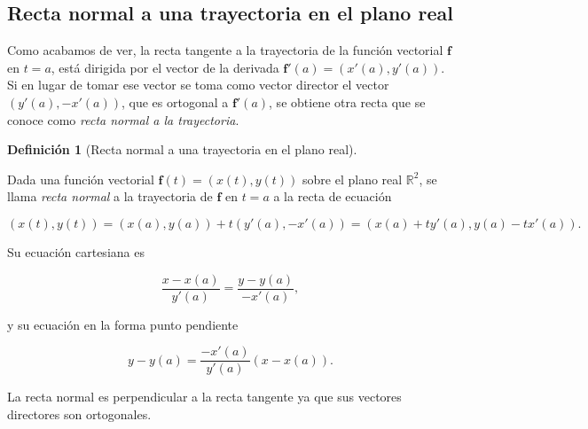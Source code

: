 \documentclass[
  a4paper,
]{scrreport}
\theoremstyle{plain}
\theoremstyle{definition}
\theoremstyle{plain}
\theoremstyle{plain}
\theoremstyle{definition}
\theoremstyle{definition}
\newtheorem{definition}{Definición}[chapter]
\theoremstyle{remark}
\begin{document}
\subsection{Recta normal a una trayectoria en el plano
real}\label{recta-normal-a-una-trayectoria-en-el-plano-real}

Como acabamos de ver, la recta tangente a la trayectoria de la función
vectorial \(\mathbf{f}\) en \(t=a\), está dirigida por el vector de la
derivada \(\mathbf{f}'(a)=(x'(a),y'(a))\). Si en lugar de tomar ese
vector se toma como vector director el vector \((y'(a),-x'(a))\), que es
ortogonal a \(\mathbf{f}'(a)\), se obtiene otra recta que se conoce como
\emph{recta normal a la trayectoria}.

\begin{definition}[Recta normal a una trayectoria en el plano
real]\protect\hypertarget{def-normal-trayectoria-plano}{}\label{def-normal-trayectoria-plano}

Dada una función vectorial \(\mathbf{f}(t)=(x(t),y(t))\) sobre el plano
real \(\mathbb{R}^2\), se llama \emph{recta normal} a la trayectoria de
\(\mathbf{f}\) en \(t=a\) a la recta de ecuación

\[
(x(t),y(t)) = (x(a),y(a))+t(y'(a),-x'(a)) = (x(a)+ty'(a),y(a)-tx'(a)).
\]

\end{definition}

Su ecuación cartesiana es

\[
\frac{x-x(a)}{y'(a)} = \frac{y-y(a)}{-x'(a)},
\]

y su ecuación en la forma punto pendiente

\[
y-y(a) = \frac{-x'(a)}{y'(a)}(x-x(a)).
\]

\begin{tcolorbox}[enhanced jigsaw, titlerule=0mm, arc=.35mm, colframe=quarto-callout-note-color-frame, bottomrule=.15mm, opacitybacktitle=0.6, rightrule=.15mm, coltitle=black, colback=white, toprule=.15mm, title=\textcolor{quarto-callout-note-color}{\faInfo}\hspace{0.5em}{Nota}, leftrule=.75mm, bottomtitle=1mm, opacityback=0, breakable, colbacktitle=quarto-callout-note-color!10!white, toptitle=1mm, left=2mm]

La recta normal es perpendicular a la recta tangente ya que sus vectores
directores son ortogonales.

\end{tcolorbox}
\end{document}
